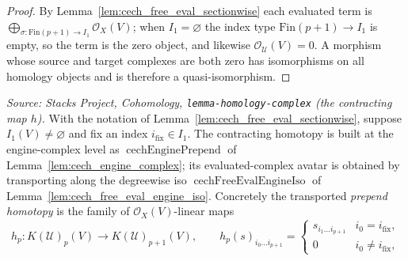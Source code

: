 \begin{proof}
  By Lemma~\ref{lem:cech_free_eval_sectionwise} each evaluated term is
  \(\bigoplus_{\sigma : \mathrm{Fin}(p+1) \to I_1} \mathcal{O}_X(V)\); when
  \(I_1 = \varnothing\) the index type \(\mathrm{Fin}(p+1) \to I_1\) is empty, so the
  term is the zero object, and likewise \(\mathcal{O}_{\mathcal{U}}(V) = 0\). A
  morphism whose source and target complexes are both zero has isomorphisms on all
  homology objects and is therefore a quasi-isomorphism.
\end{proof}

\begin{lemma}
  \label{lem:cech_free_eval_prepend_homotopy}
  \textit{Source: Stacks Project, Cohomology, \texttt{lemma-homology-complex}
  (the contracting map \(h\)).}
  With the notation of Lemma~\ref{lem:cech_free_eval_sectionwise}, suppose
  \(I_1(V) \neq \varnothing\) and fix an index \(i_{\mathrm{fix}} \in I_1\). The
  contracting homotopy is built at the engine-complex level as
  \(\operatorname{cechEnginePrepend}\) of Lemma~\ref{lem:cech_engine_complex}; its
  evaluated-complex avatar is obtained by transporting along the degreewise iso
  \(\operatorname{cechFreeEvalEngineIso}\) of
  Lemma~\ref{lem:cech_free_eval_engine_iso}. Concretely the transported
  \emph{prepend homotopy} is the family of \(\mathcal{O}_X(V)\)-linear maps
  \[
    h_p : K(\mathcal{U})_p(V) \longrightarrow K(\mathcal{U})_{p+1}(V),
    \qquad
    h_p(s)_{i_0 \ldots i_{p+1}} =
      \begin{cases}
        s_{i_1 \ldots i_{p+1}} & i_0 = i_{\mathrm{fix}}, \\
        0 & i_0 \neq i_{\mathrm{fix}},
      \end{cases}
\]
\end{lemma}
